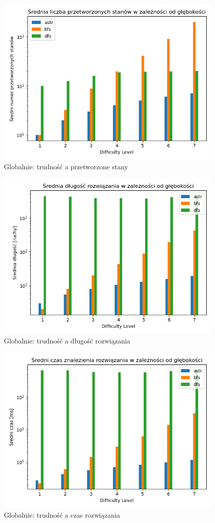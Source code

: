 \documentclass{classrep}
\begin{document}
\begin{figure}[p] \centering
 \includegraphics[width=0.9\linewidth]{./pic/glob_proc_c_vs_diff.png}
 \caption{Globalnie: trudność a przetworzone stany}
\end{figure}
\begin{figure}[p] \centering
 \includegraphics[width=0.9\linewidth]{./pic/glob_sol_len_vs_diff.png}
 \caption{Globalnie: trudność a długość rozwiązania}
\end{figure}
\begin{figure}[p] \centering
 \includegraphics[width=0.9\linewidth]{./pic/glob_time_vs_diff.png}
 \caption{Globalnie: trudność a czas rozwiązania}
\end{figure}
\end{document}
